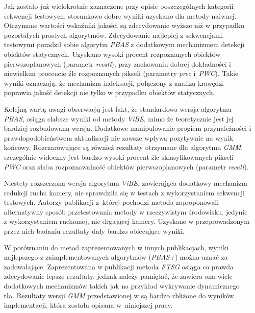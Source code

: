 Jak zostało już wielokrotnie zaznaczone przy opisie poszczególnych kategorii sekwencji testowych, stosunkowo dobre wyniki uzyskano dla metody naiwnej. 
Otrzymane wartości wskaźniki jakości są zdecydowanie wyższe niż w przypadku pozostałych prostych algorytmów. 
Zdecydowanie najlepiej z sekwencjami testowymi poradził sobie algorytm \textit{PBAS} z dodatkowym mechanizmem detekcji obiektów statycznych.
Uzyskano wysoki procent rozpoznanych obiektów pierwszoplanowych (parametr \textit{recall}), przy zachowaniu dobrej dokładności i niewielkim procencie źle rozpoznanych pikseli (parametry \textit{prec} i~\textit{PWC}). 
Takie wyniki oznaczają, że mechanizm indeksacji, połączony z analizą krawędzi poprawia jakość detekcji nie tylko w przypadku obiektów statycznych. 

Kolejną wartą uwagi obserwacją jest fakt, że standardowa wersja algorytmu \textit{PBAS}, osiąga słabsze wyniki od metody \textit{ViBE}, mimo że teoretycznie jest jej bardziej rozbudowaną wersją. 
Dodatkowe manipulowanie progiem przynależności i prawdopodobieństwem aktualizacji nie zawsze wpływa pozytywnie na wynik końcowy. 
Rozczarowujące są również rezultaty otrzymane dla algorytmu \textit{GMM}, szczególnie widoczny jest bardzo wysoki procent źle sklasyfikowanych pikseli \textit{PWC} oraz słaba rozpoznawalność obiektów pierwszoplanowych (parametr \textit{recall}).

Niestety rozszerzona wersja algorytmu \textit{ViBE}, zawierająca dodatkowy mechanizm redukcji ruchu kamery, nie sprawdziła się w testach z wykorzystaniem sekwencji testowych. 
Autorzy publikacji \cite{kryjak_14_vibe} z~której pochodzi metoda zaproponowali alternatywny sposób przetestowania metody w rzeczywistym środowisku, jedynie z wykorzystaniem ruchomej, nie drgającej kamery. 
Uzyskane w przeprowadzonym przez nich badaniu rezultaty dały bardzo obiecujące wyniki.

W porównaniu do metod zaprezentowanych w innych publikacjach, wyniki najlepszego z zaimplementowanych algorytmów (\textit{PBAS+}) można uznać za zadowalające. 
Zaprezentowana w publikacji \cite{wang_14} metoda \textit{FTSG} osiąga co prawda zdecydowanie lepsze rezultaty, jednak należy pamiętać, że zawiera ona wiele dodatkowych mechanizmów takich jak na przykład wykrywanie dynamicznego tła. 
Rezultaty wersji \textit{GMM} przedstawionej w \cite{KaewTraKulPong_01} są bardzo zbliżone do wyników implementacji, która została opisana w~niniejszej pracy.
